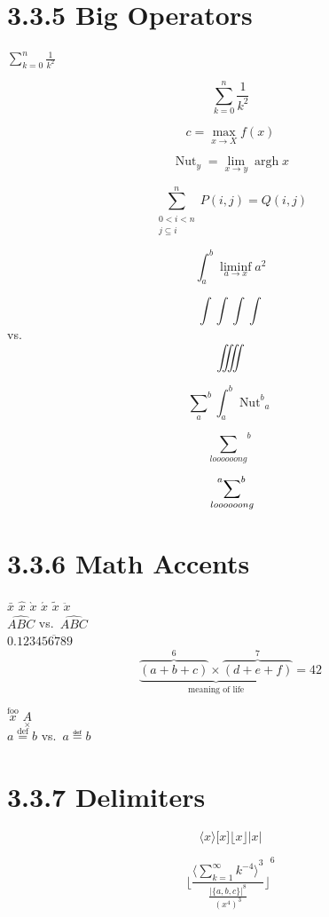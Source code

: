 \documentclass{article}
\DeclareMathOperator{\argh}{argh}
\DeclareMathOperator*{\nut}{Nut}
\begin{document}
\section{3.3.5 Big Operators}

\(
\sum_{k=0}^{n} \frac{1}{k^2}
\)

\[
\sum_{k=0}^{n} \frac{1}{k^2}
\]

\[
c = \max_{x \to X} f(x)
\]

\[\nut_y = \lim_{x \to y} \argh{x} \]

\[
\sum^n_{
  \substack{0<i<n \\
  j\subseteq i}
}
P(i,j) = Q(i,j)
\]

\[
\int_a^b \liminf_{a \to x} a^2
\]

\[\int\int\int\int\]
vs.
\[\iiiint\]

\[
{\sum_{a}}^b
{\int}_a^b
{\nut^b}_a
\]

\[
{\sum_{loooooong}}^{b}
\]

\[
\sideset{^{a}}{^{b}}{\sum}_{loooooong}
\]

\section{3.3.6 Math Accents}

\(\bar{x}\) \(\hat{x}\)
\(\grave{x}\) \(\acute{x}\)
\(\tilde{x}\) \(\ddot{x}\)\\[0.5cm]

\(\hat{ABC}\) vs.\
\(\widehat{ABC}\)\\[0.5cm]

\(0.123\overline{456789}\)\\[0.5cm]

\[
\underbrace{
  \overbrace{(a+b+c)}^6
  \times
  \overbrace{(d+e+f)}^7
}_{\text{meaning of life}}=42
\]

\(
\overset{\text{foo}}{x}
\)
\(
\underset{\times}{A}
\)\\[0.5cm]

\(
a \overset{\text{def}}{=} b
\)
vs.\
\(a \eqdef b\)

\section{3.3.7 Delimiters}

\[
\langle x \rangle
\lbrack x \rbrack
\lfloor x \rfloor
\lvert x \rvert
\]

\[
{\lfloor
\frac{{\langle\sum_{k=1}^{\infty} k^{-4}\rangle}^3}
{\frac{{\lvert\{a,b,c\}\rvert}^8}{{(x^4)}^3}}
\rfloor}^6
\]
\end{document}
